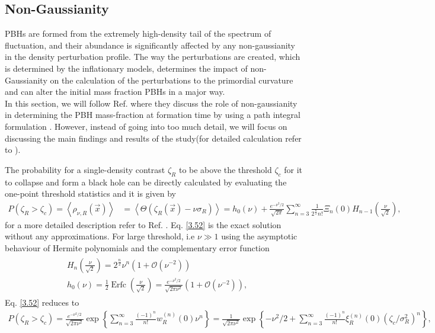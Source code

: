 \subsection{Non-Gaussianity}
PBHs are formed from the extremely high-density tail of the spectrum of fluctuation, and their abundance is significantly affected by any  non-gaussianity in the density perturbation profile.
The way the perturbations are created, which is determined by the inflationary models, determines the impact of non-Gaussianity on the calculation of the perturbations to the primordial curvature and can alter the initial mass fraction PBHs in a major way.\\
 
In this section, we will follow Ref. \cite{Franciolini:2018vbk}  where they discuss the role of non-gaussianity in determining the PBH mass-fraction at formation time by using a path integral formulation \cite{Matarrese:1986et}. However, instead of going into too much detail, we will focus on discussing the main findings and results of the study(for detailed calculation refer to \cite{Franciolini:2018vbk}).

The probability for a single-density contrast  $\zeta_{R}$ to be above the threshold $\zeta_{c}$ for it to collapse and form a black hole can be directly calculated by evaluating the one-point threshold statistics and it is given by
\begin{align}
    P\left(\zeta_{R}>\zeta_{c}\right)=\left\langle\rho_{\nu, R}(\vec{x})\right\rangle & =\left\langle\Theta\left(\zeta_{R}(\vec{x})-\nu \sigma_{R}\right)\right\rangle = h_{0}(\nu)+\frac{e^{-\nu^{2} / 2}}{\sqrt{2 \pi}} \sum_{n=3}^{\infty} \frac{1}{2^{\frac{n}{2}} n !} \Xi_{n}(0) H_{n-1}\left(\frac{\nu}{\sqrt{2}}\right), \label{3.52}
\end{align}
for a more detailed description refer to Ref. \cite{Franciolini:2018vbk, Matarrese:1986et}.
Eq. \ref{3.52} is the exact solution without any approximations. For large threshold, i.e $\nu \gg 1$ using the asymptotic behaviour of Hermite polynomials and the complementary error function 
\begin{align}
    \begin{aligned}
        & H_{n}\left(\frac{\nu}{\sqrt{2}}\right)=2^{\frac{n}{2}}                \nu^{n}\left(1+\mathcal{O}\left(\nu^{-2}\right)\right) \\
        & h_{0}(\nu)=\frac{1}{2} \operatorname{Erfc}\left(\frac{\nu}{\sqrt{2}}\right)=\frac{e^{-\nu^{2} / 2}}{\sqrt{2 \pi \nu^{2}}}\left(1+\mathcal{O}\left(\nu^{-2}\right)\right),\label{3.53}
    \end{aligned}
\end{align}
Eq. \ref{3.52} reduces to
\begin{align}
    P\left(\zeta_{R}>\zeta_{c}\right)=\frac{e^{-\nu^{2} / 2}}{\sqrt{2 \pi \nu^{2}}} \exp \left\{\sum_{n=3}^{\infty} \frac{(-1)^{n}}{n !} w_{R}^{(n)}(0) \nu^{n}\right\}=\frac{1}{\sqrt{2 \pi \nu^{2}}} \exp \left\{-\nu^{2} / 2+\sum_{n=3}^{\infty} \frac{(-1)^{n}}{n !} \xi_{R}^{(n)}(0)\left(\zeta_{c} / \sigma_{R}^{2}\right)^{n}\right\}, \label{3.54}
\end{align}

